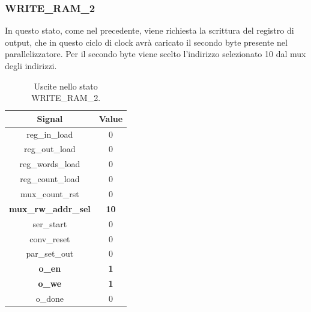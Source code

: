 \documentclass[a4paper]{report}
\begin{document}
\subsubsection{WRITE\_RAM\_2}
In questo stato, come nel precedente, viene richiesta la scrittura del registro di output, che in questo ciclo di clock avrà caricato il secondo byte presente nel parallelizzatore. Per il secondo byte viene scelto l'indirizzo selezionato 10 dal mux degli indirizzi.
\begin{table}[H]
  \centering
  \begin{tabular}{||c | c||} 
    \hline
    Signal & Value \\
    \hline\hline
    reg\_in\_load & 0 \\
    reg\_out\_load & 0 \\
    reg\_words\_load & 0 \\
    reg\_count\_load & 0 \\
    mux\_count\_rst & 0 \\
    \textbf{mux\_rw\_addr\_sel} & \textbf{10} \\
    ser\_start & 0 \\
    conv\_reset & 0 \\
    par\_set\_out & 0 \\
    \textbf{o\_en} & \textbf{1} \\
    \textbf{o\_we} & \textbf{1} \\
    o\_done & 0 \\
   \hline
  \end{tabular}
  \caption{Uscite nello stato WRITE\_RAM\_2.}
  \label{table:9}
\end{table}
\end{document}
